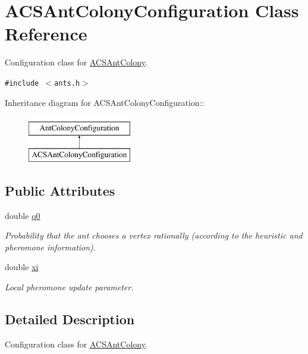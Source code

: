 \hypertarget{classACSAntColonyConfiguration}{
\section{ACSAntColonyConfiguration Class Reference}
\label{classACSAntColonyConfiguration}
}
Configuration class for \hyperlink{classACSAntColony}{ACSAntColony}.  


{\tt \#include $<$ants.h$>$}

Inheritance diagram for ACSAntColonyConfiguration::\begin{figure}[H]
\begin{center}
\leavevmode
\includegraphics[height=2cm]{classACSAntColonyConfiguration}
\end{center}
\end{figure}
\subsection*{Public Attributes}
\begin{CompactItemize}
\item 
double \hyperlink{classACSAntColonyConfiguration_237f5ebe10da6ad5b037f207ae9ed939}{q0}
\begin{CompactList}\small\item\em Probability that the ant chooses a vertex rationally (according to the heuristic and pheromone information). \item\end{CompactList}\item 
\hypertarget{classACSAntColonyConfiguration_05eebf1479fd61590c5f39aaf065c5c8}{
double \hyperlink{classACSAntColonyConfiguration_05eebf1479fd61590c5f39aaf065c5c8}{xi}}
\label{classACSAntColonyConfiguration_05eebf1479fd61590c5f39aaf065c5c8}

\begin{CompactList}\small\item\em Local pheromone update parameter. \item\end{CompactList}\end{CompactItemize}


\subsection{Detailed Description}
Configuration class for \hyperlink{classACSAntColony}{ACSAntColony}. 

